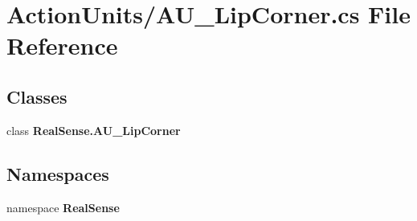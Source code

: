 \section{Action\+Units/\+A\+U\+\_\+\+Lip\+Corner.cs File Reference}
\label{_a_u___lip_corner_8cs}
\subsection*{Classes}
\begin{DoxyCompactItemize}
\item 
class \textbf{ Real\+Sense.\+A\+U\+\_\+\+Lip\+Corner}
\end{DoxyCompactItemize}
\subsection*{Namespaces}
\begin{DoxyCompactItemize}
\item 
namespace \textbf{ Real\+Sense}
\end{DoxyCompactItemize}
